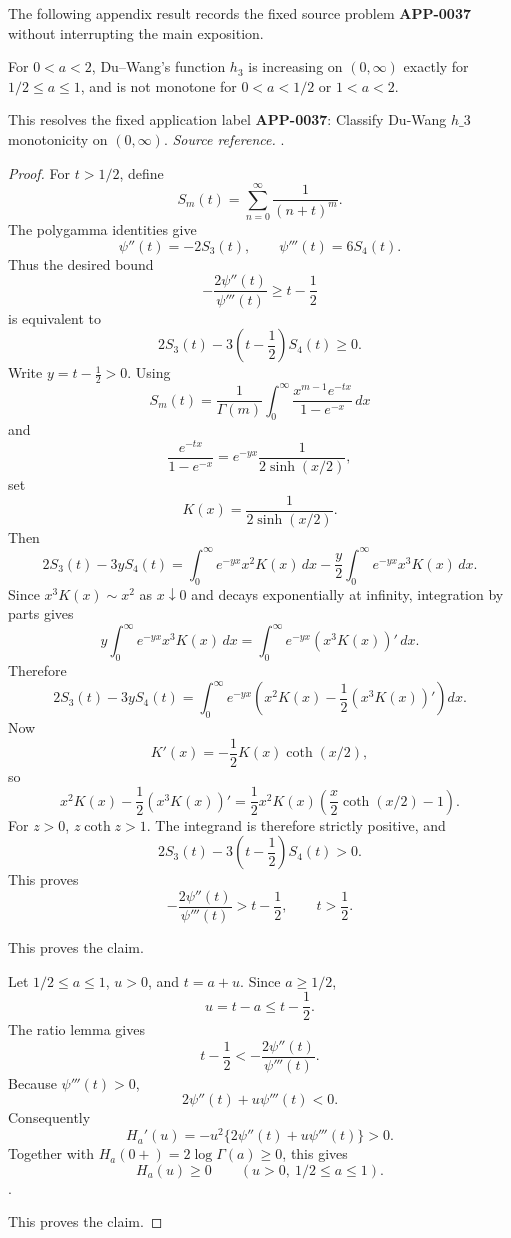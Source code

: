 The following appendix result records the fixed source problem \textbf{APP-0037} \cite{du-wang-h3} without interrupting the main exposition.
\begin{proposition}
\label{res:du-wang-h3-open-problem-2-classification}
For \(0<a<2\), Du--Wang's function \(h_3\) is increasing on \((0,\infty)\) exactly for \(1/2\le a\le1\), and is not monotone for \(0<a<1/2\) or \(1<a<2\).

This resolves the fixed application label \textbf{APP-0037}: Classify Du-Wang \(h\_3\) monotonicity on \((0,\infty)\).
\emph{Source reference.} \cite{du-wang-h3}.
\end{proposition}
\begin{proof}
For \(t>1/2\), define
\[
S_m(t)=\sum_{n=0}^{\infty}\frac1{(n+t)^m}.
\]
The polygamma identities give
\[
\psi''(t)=-2S_3(t),\qquad \psi'''(t)=6S_4(t).
\]
Thus the desired bound
\[
-\frac{2\psi''(t)}{\psi'''(t)}\ge t-\frac12
\]
is equivalent to
\[
2S_3(t)-3\left(t-\frac12\right)S_4(t)\ge0.
\]
Write \(y=t-\frac12>0\).  Using
\[
S_m(t)=\frac1{\Gamma(m)}
\int_0^\infty \frac{x^{m-1}e^{-tx}}{1-e^{-x}}\,dx
\]
and
\[
\frac{e^{-tx}}{1-e^{-x}}
=e^{-yx}\frac1{2\sinh(x/2)},
\]
set
\[
K(x)=\frac1{2\sinh(x/2)}.
\]
Then
\[
2S_3(t)-3yS_4(t)
=
\int_0^\infty e^{-yx}x^2K(x)\,dx
-\frac y2\int_0^\infty e^{-yx}x^3K(x)\,dx.
\]
Since \(x^3K(x)\sim x^2\) as \(x\downarrow0\) and decays exponentially at
infinity, integration by parts gives
\[
y\int_0^\infty e^{-yx}x^3K(x)\,dx
=
\int_0^\infty e^{-yx}(x^3K(x))'\,dx.
\]
Therefore
\[
2S_3(t)-3yS_4(t)
=
\int_0^\infty e^{-yx}
\left(x^2K(x)-\frac12(x^3K(x))'\right)dx.
\]
Now
\[
K'(x)=-\frac12K(x)\coth(x/2),
\]
so
\[
x^2K(x)-\frac12(x^3K(x))'
=
\frac12x^2K(x)\left(\frac x2\coth(x/2)-1\right).
\]
For \(z>0\), \(z\coth z>1\).  The integrand is therefore strictly positive,
and
\[
2S_3(t)-3\left(t-\frac12\right)S_4(t)>0.
\]
This proves
\[
-\frac{2\psi''(t)}{\psi'''(t)}>t-\frac12,
\qquad t>\frac12.
\]

This proves the claim.

Let \(1/2\le a\le1\), \(u>0\), and \(t=a+u\).  Since \(a\ge1/2\),
\[
u=t-a\le t-\frac12.
\]
The ratio lemma gives
\[
t-\frac12<-\frac{2\psi''(t)}{\psi'''(t)}.
\]
Because \(\psi'''(t)>0\),
\[
2\psi''(t)+u\psi'''(t)<0.
\]
Consequently
\[
H_a'(u)=-u^2\{2\psi''(t)+u\psi'''(t)\}>0.
\]
Together with \(H_a(0+)=2\log\Gamma(a)\ge0\), this gives
\[
H_a(u)\ge0
\qquad (u>0,\ 1/2\le a\le1).
\] \cite{du-wang-h3}.

This proves the claim.


\end{proof}
